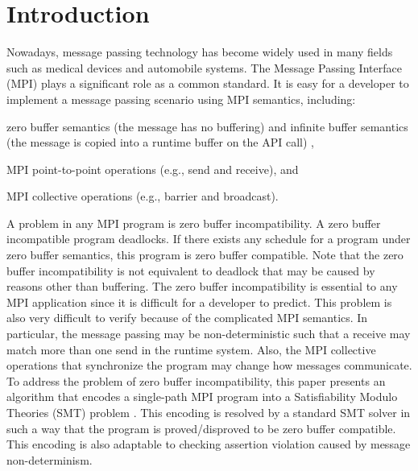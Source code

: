 \section{Introduction}
Nowadays, message passing technology has become widely used in many fields such as medical devices and automobile systems. The Message Passing Interface (MPI) plays a significant role as a common standard. It is easy for a developer to implement a message passing scenario using MPI semantics, including:

\begin{compactitem}
\item zero buffer semantics (the message has no buffering) and infinite buffer semantics (the message is copied into a runtime buffer on the API call) \cite{DBLP:conf/fm/VakkalankaVGK09},
\item MPI point-to-point operations (e.g., send and receive), and
\item MPI collective operations (e.g., barrier and broadcast).
\end{compactitem}

A problem in any MPI program is zero buffer incompatibility. A zero buffer incompatible program deadlocks. If there exists any schedule for a program under zero buffer semantics, this program is zero buffer compatible. Note that the zero buffer incompatibility is not equivalent to deadlock that may be caused by reasons other than buffering. The zero buffer incompatibility is essential to any MPI application since it is difficult for a developer to predict. 
This problem is also very difficult to verify because of the complicated MPI semantics.
In particular, the message passing may be non-deterministic such that a receive may match more than one send in the runtime system. Also, the MPI collective operations that synchronize the program may change how messages communicate. To address the problem of zero buffer incompatibility, this paper presents an algorithm that encodes a single-path MPI program into a Satisfiability Modulo Theories (SMT) problem \cite{barrett2008satisfiability}. This encoding is resolved by a standard SMT solver in such a way that the program is proved/disproved to be zero buffer compatible. This encoding is also adaptable to checking assertion violation caused by message non-determinism.

